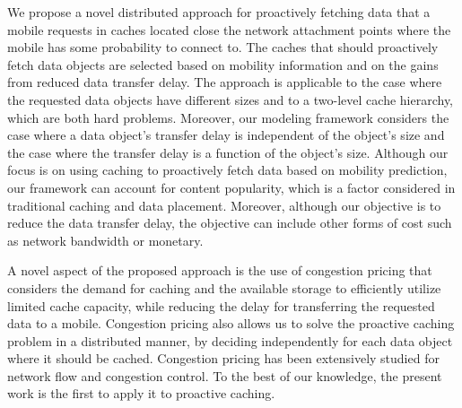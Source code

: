 \documentclass[conference]{IEEEtran}
\begin{document}
We propose a novel distributed approach for proactively fetching  data that a mobile requests in caches located close the network attachment points where the mobile has some probability to connect to.
The caches that should proactively fetch data objects are selected based on mobility information and on the gains from reduced data transfer delay.
The approach is applicable to the case where the requested data objects have different sizes and to a  two-level cache hierarchy, which are both hard problems. Moreover, our modeling framework considers the case where a data object's transfer delay is independent of the object's size and the case where the transfer delay is a function of the object's size.
Although our focus is on using caching to proactively fetch data based on mobility prediction, our framework can account for content popularity, which is a factor considered in traditional caching and data placement. Moreover, although our objective is to reduce the data transfer delay, the objective can include other forms of cost such as network bandwidth or monetary.

A novel aspect of the proposed approach is the use of   congestion pricing  that considers the demand for caching and the available storage  to efficiently utilize limited cache capacity, while reducing the  delay  for transferring the requested data to a mobile.
Congestion pricing also allows us to solve the proactive caching problem in a distributed manner, by deciding independently for each data object where it should be cached.
Congestion pricing has been extensively studied for network flow and congestion control.
To the best of our knowledge, the present work is the first to apply it to proactive caching.
\end{document}
